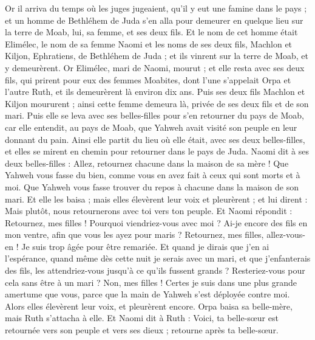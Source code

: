 \begin{multicols}{2}
\VerseOne{}Or il arriva du temps où les juges jugeaient, qu'il y eut une famine dans le pays ; et un homme de Bethléhem de Juda s'en alla pour demeurer en quelque lieu sur la terre de Moab, lui, sa femme, et ses deux fils.
Et le nom de cet homme était Elimélec, le nom de sa femme Naomi et les noms de ses deux fils, Machlon et Kiljon, Ephratiens, de Bethléhem de Juda ; et ils vinrent sur la terre de Moab, et y demeurèrent.
Or Elimélec, mari de Naomi, mourut ; et elle resta avec ses deux fils,
qui prirent pour eux des femmes Moabites, dont l'une s'appelait Orpa et l'autre Ruth, et ils demeurèrent là environ dix ans.
Puis ses deux fils Machlon et Kiljon moururent ; ainsi cette femme demeura là, privée de ses deux fils et de son mari.
Puis elle se leva avec ses belles-filles pour s'en retourner du pays de Moab, car elle entendit, au pays de Moab, que Yahweh avait visité son peuple en leur donnant du pain.
Ainsi elle partit du lieu où elle était, avec ses deux belles-filles, et elles se mirent en chemin pour retourner dans le pays de Juda.
Naomi dit à ses deux belles-filles : Allez, retournez chacune dans la maison de sa mère ! Que Yahweh vous fasse du bien, comme vous en avez fait à ceux qui sont morts et à moi.
Que Yahweh vous fasse trouver du repos à chacune dans la maison de son mari. Et elle les baisa ; mais elles élevèrent leur voix et pleurèrent ;
et lui dirent : Mais plutôt, nous retournerons avec toi vers ton peuple.
Et Naomi répondit : Retournez, mes filles ! Pourquoi viendriez-vous avec moi ? Ai-je encore des fils en mon ventre, afin que vous les ayez pour maris ?
Retournez, mes filles, allez-vous-en ! Je suis trop âgée pour être remariée. Et quand je dirais que j'en ai l'espérance, quand même dès cette nuit je serais avec un mari, et que j'enfanterais des fils,
les attendriez-vous jusqu'à ce qu'ils fussent grands ? Resteriez-vous pour cela sans être à un mari ? Non, mes filles ! Certes je suis dans une plus grande amertume que vous, parce que la main de Yahweh s'est déployée contre moi.
Alors elles élevèrent leur voix, et pleurèrent encore. Orpa baisa sa belle-mère, mais Ruth s'attacha à elle.
Et Naomi dit à Ruth : Voici, ta belle-sœur est retournée vers son peuple et vers ses dieux ; retourne après ta belle-sœur.

\end{multicols}
